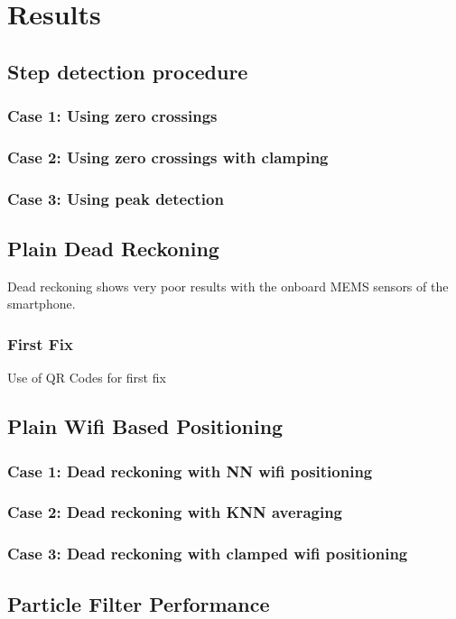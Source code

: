 \chapter{Results}

\section{Step detection procedure}
\subsection{Case 1: Using zero crossings}
\subsection{Case 2: Using zero crossings with clamping}
\subsection{Case 3: Using peak detection}

\section{Plain Dead Reckoning}
Dead reckoning shows very poor results with the onboard MEMS sensors of the
smartphone.
\subsection{First Fix}
Use of QR Codes for first fix


\section{Plain Wifi Based Positioning}
\subsection{Case 1: Dead reckoning with NN wifi positioning}
\subsection{Case 2: Dead reckoning with KNN averaging}
\subsection{Case 3: Dead reckoning with clamped wifi positioning}

\section{Particle Filter Performance}
